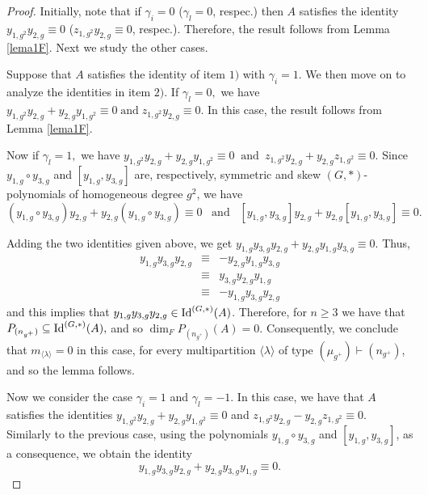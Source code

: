 \documentclass{amsart}
\newcommand{\IdG}{\ensuremath{\textnormal{Id}^{(G,\ast)}}}
\numberwithin{equation}{section}
\begin{document}
\begin{proof}

    Initially, note that if $\gamma_{i} = 0$ ($\gamma_l=0$, respec.) then $A$ satisfies the identity $y_{1,g^2}y_{2,g}\equiv 0$ ($z_{1,g^2}y_{2,g}\equiv 0$, respec.). Therefore, the result follows from Lemma \ref{lema1F}. Next we study the other cases.
    
    Suppose that $A$ satisfies the identity of item $1)$ with $\gamma_{i}=1$. We then move on to analyze the identities in item $2)$. 
    If $\gamma_{l}=0,$ we have  $y_{1,g^2}y_{2,g}+y_{2,g}y_{1,g^2} \equiv 0 \; \mbox{and}\;z_{1,g^2}y_{2,g}  \equiv 0. $ In this case, the result follows from Lemma \ref{lema1F}. 

   	Now if $\gamma_{l}=1,$ we have  
$y_{1,g^2}y_{2,g}+y_{2,g}y_{1,g^2}\equiv 0 \;\;\mbox{and}\;\ z_{1,g^2}y_{2,g}+y_{2,g}z_{1,g^2}\equiv 0.$  
Since $y_{1,g}\circ y_{3,g}$ and $[y_{1,g},y_{3,g}]$ are, respectively, symmetric and skew $(G,*)$-polynomials of homogeneous degree $g^2$, we have
$$(y_{1,g}\circ y_{3,g})y_{2,g}+y_{2,g}(y_{1,g}\circ y_{3,g})\equiv 0 \;\;\;\mbox{and}\;\;\; [y_{1,g},y_{3,g}]y_{2,g}+y_{2,g}[y_{1,g},y_{3,g}]\equiv 0.$$    

 Adding the two identities given above, we get 
$y_{1,g}y_{3,g}y_{2,g}+y_{2,g}y_{1,g}y_{3,g}\equiv 0.$  
 Thus,
$$ 
    \begin{array}{ccl}y_{1,g}y_{3,g}y_{2,g}& \equiv& -y_{2,g}y_{1,g}y_{3,g}\\ & \equiv & y_{3,g}y_{2,g}y_{1,g} \\ & \equiv& -y_{1,g}y_{3,g}y_{2,g}\end{array}$$
	and this implies that  $y_{1,g}y_{3,g}y_{2,g}\in \IdG(A)$.
	Therefore, for $n \ge 3$ we have that $P_{(n_{g^+})} \subseteq \IdG(A),$ and so $\dim_FP_{(n_{g^+})}(A)=0$. Consequently, we conclude that $m_{\langle \lambda \rangle}= 0$ in this case, for every multipartition $\langle \lambda \rangle$ of type $(\mu_{g^+})\vdash (n_{g^+})$, and so the lemma follows. 
     

	Now we consider the case $\gamma_{i}=1$ and $\gamma_{l}=-1$. In this case, we have that $A$ satisfies the identities 	$	y_{1,g^2}y_{2,g}+y_{2,g}y_{1,g^2}\equiv 0$ and 
$	z_{1,g^2}y_{2,g}-y_{2,g}z_{1,g^2}\equiv 0. $
  Similarly to the previous case, using the polynomials $y_{1,g}\circ y_{3,g}$ and $[y_{1,g},y_{3,g}]$, as a consequence,  we obtain the identity 
    	\begin{equation} \label{eq7F}
y_{1,g}y_{3,g}y_{2,g}+y_{2,g}y_{3,g}y_{1,g} \equiv 0.
	\end{equation}	
    

\end{proof}
\end{document}
